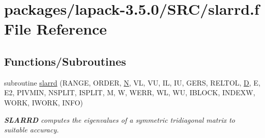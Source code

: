 \hypertarget{slarrd_8f}{}\section{packages/lapack-\/3.5.0/\+S\+R\+C/slarrd.f File Reference}
\label{slarrd_8f}
\subsection*{Functions/\+Subroutines}
\begin{DoxyCompactItemize}
\item 
subroutine \hyperlink{group__auxOTHERauxiliary_ga137b773fc78098f8177b09e7d6dc3c91}{slarrd} (R\+A\+N\+G\+E, O\+R\+D\+E\+R, \hyperlink{polmisc_8c_a0240ac851181b84ac374872dc5434ee4}{N}, V\+L, V\+U, I\+L, I\+U, G\+E\+R\+S, R\+E\+L\+T\+O\+L, \hyperlink{odrpack_8h_a7dae6ea403d00f3687f24a874e67d139}{D}, E, E2, P\+I\+V\+M\+I\+N, N\+S\+P\+L\+I\+T, I\+S\+P\+L\+I\+T, M, W, W\+E\+R\+R, W\+L, W\+U, I\+B\+L\+O\+C\+K, I\+N\+D\+E\+X\+W, W\+O\+R\+K, I\+W\+O\+R\+K, I\+N\+F\+O)
\begin{DoxyCompactList}\small\item\em {\bfseries S\+L\+A\+R\+R\+D} computes the eigenvalues of a symmetric tridiagonal matrix to suitable accuracy. \end{DoxyCompactList}\end{DoxyCompactItemize}
